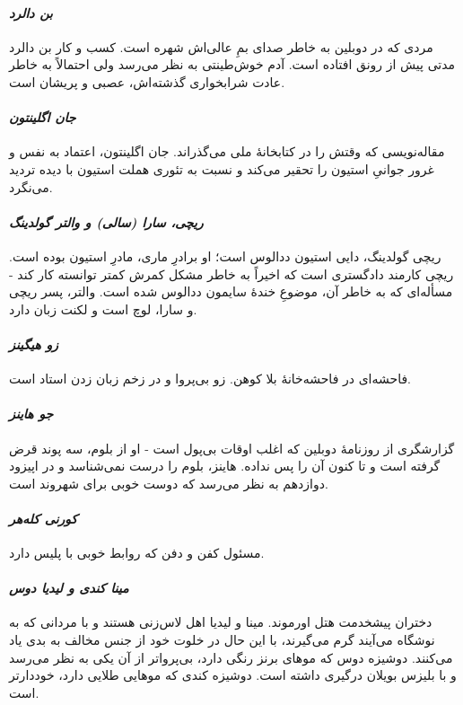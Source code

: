 \documentclass[12pt]{book}
\newcommand{\noun}[1]{\textit{\textcolor{black!70}{#1}}}
\begin{document}
    \paragraph{\noun{بن دالرد}\protect{}}
    مردی که در دوبلین به خاطر صدای بمِ عالی‌اش شهره است. کسب و کار بن دالرد مدتی پیش از رونق افتاده است. آدم خوش‌طینتی به نظر می‌رسد ولی احتمالاً به خاطر عادت شرابخواری گذشته‌اش، عصبی و پریشان است.
    \paragraph{\noun{جان اگلینتون}\protect{}}
    مقاله‌نویسی که وقتش را در کتابخانۀ ملی می‌گذراند. جان اگلینتون، اعتماد به نفس و غرور جوانیِ استیون را تحقیر می‌کند و نسبت به تئوری هملت استیون با دیده تردید می‌نگرد.
    \paragraph{\noun{ریچی، سارا (سالی) و والتر گولدینگ}\protect{}}
    ریچی گولدینگ، دایی استیون ددالوس است؛ او برادرِ ماری، مادرِ استیون بوده است. ریچی کارمند دادگستری است که اخیراً به خاطر مشکل کمرش کمتر توانسته کار کند - مسأله‌ای که به خاطر آن، موضوعِ خندۀ سایمون ددالوس شده است. والتر، پسر ریچی و سارا، لوچ است و لکنت زبان دارد.
    \paragraph{\noun{زو هیگینز}\protect{}}
    فاحشه‌ای در فاحشه‌خانۀ بلا کوهن. زو بی‌پروا و در زخم زبان زدن استاد است.
    \paragraph{\noun{جو هاینز}\protect{}}
    گزارشگری از روزنامۀ دوبلین که اغلب اوقات بی‌پول است - او از بلوم، سه پوند قرض گرفته است و تا کنون آن را پس نداده. هاینز، بلوم را درست نمی‌شناسد و در اپیزود دوازدهم به نظر می‌رسد که دوست خوبی برای شهروند است.
    \paragraph{\noun{کورنی کله‌هر}\protect{}}
    مسئول کفن و دفن که روابط خوبی با پلیس دارد.
    \paragraph{\noun{مینا کندی و لیدیا دوس}\protect{}}
    دختران پیشخدمت هتل اورموند. مینا و لیدیا اهل لاس‌زنی هستند و با مردانی که به نوشگاه می‌آیند گرم می‌گیرند، با این حال در خلوت خود از جنس مخالف به بدی یاد می‌کنند. دوشیزه دوس که موهای برنز رنگی دارد، بی‌پرواتر از آن یکی به نظر می‌رسد و با بلیزس بویلان درگیری داشته است. دوشیزه کندی که موهایی طلایی دارد، خوددارتر است.
\end{document}
